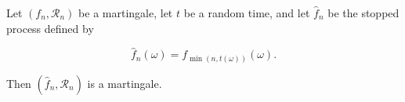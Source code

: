 Let $(f_n, \mathcal{R}_n)$ be a martingale, let $t$ be a random time, and let $\hat{f}_n$ be the stopped process defined by

$$\hat{f}_n(\omega) = f_{\min(n, t(\omega))}(\omega).$$

Then $(\hat{f}_n, \mathcal{R}_n)$ is a martingale.
